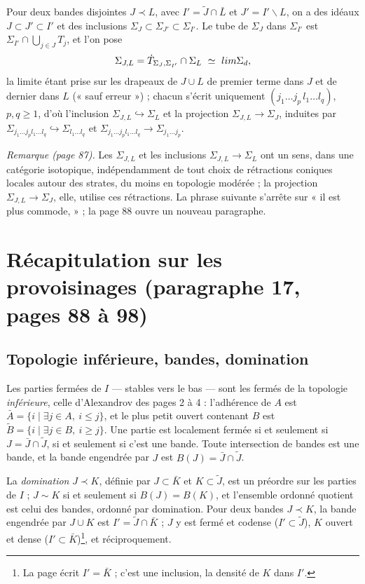 \documentclass[11pt,a4paper]{article}
\begin{document}
Pour deux bandes disjointes $J \prec L$, avec $I' = \tilde J \cap \bar L$ et $J' = I'
\smallsetminus L$, on a des idéaux $J \subset J' \subset I'$ et des inclusions $\Sigma_J
\subset \Sigma_{J'} \subset \Sigma_{I'}$. Le tube de $\Sigma_J$ dans $\Sigma_{I'}$
est $\Sigma_{I'} \cap \bigcup_{j \in J} T_j$, et l'on pose
\[
\Sigma_{J,L} = \dot T_{\Sigma_J, \Sigma_{I'}} \cap \Sigma_L \ \simeq\
\varinjlim \Sigma_d ,
\]
la limite étant prise sur les drapeaux de $J \cup L$ de premier terme dans $J$ et de
dernier dans $L$ (« sauf erreur ») ; chacun s'écrit uniquement $(j_1 … j_p\, l_1
… l_q)$, $p, q \geq 1$, d'où l'inclusion $\Sigma_{J,L} \hookrightarrow \Sigma_L$
et la projection $\Sigma_{J,L} \to \Sigma_J$, induites par $\Sigma_{j_1 … j_p l_1
… l_q} \hookrightarrow \Sigma_{l_1 … l_q}$ et $\Sigma_{j_1 … j_p l_1
… l_q} \to \Sigma_{j_1 … j_p}$.

\emph{Remarque (page 87).} Les $\Sigma_{J,L}$ et les inclusions $\Sigma_{J,L} \to
\Sigma_L$ ont un sens, dans une catégorie isotopique, indépendamment de tout choix
de rétractions coniques locales autour des strates, du moins en topologie modérée ;
la projection $\Sigma_{J,L} \to \Sigma_J$, elle, utilise ces rétractions. La phrase
suivante s'arrête sur « il est plus commode, » ; la page 88 ouvre un nouveau
paragraphe.

\section*{Récapitulation sur les provoisinages (paragraphe 17, pages 88 à 98)}

\subsection*{Topologie inférieure, bandes, domination}

Les parties fermées de $I$ — stables vers le bas — sont les fermés de la topologie
\emph{inférieure}, celle d'Alexandrov des pages 2 à 4 : l'adhérence de $A$ est $\bar
A = \{ i \mid \exists j \in A,\ i \leq j \}$, et le plus petit ouvert contenant $B$ est
$\tilde B = \{ i \mid \exists j \in B,\ i \geq j \}$. Une partie est localement fermée
si et seulement si $J = \bar J \cap \tilde J$, si et seulement si c'est une bande.
Toute intersection de bandes est une bande, et la bande engendrée par $J$ est $B(J) =
\bar J \cap \tilde J$.

La \emph{domination} $J \prec K$, définie par $J \subset \bar K$ et $K \subset \tilde J$,
est un préordre sur les parties de $I$ ; $J \sim K$ si et seulement si $B(J) = B(K)$, et
l'ensemble ordonné quotient est celui des bandes, ordonné par domination. Pour deux
bandes $J \prec K$, la bande engendrée par $J \cup K$ est $I' = \tilde J \cap \bar
K$ ; $J$ y est fermé et codense ($I' \subset \tilde J$), $K$ ouvert et dense ($I'
\subset \bar K$)\footnote{La page écrit $I' = \bar K$ ; c'est une inclusion, la
densité de $K$ dans $I'$.}, et réciproquement.
\end{document}
